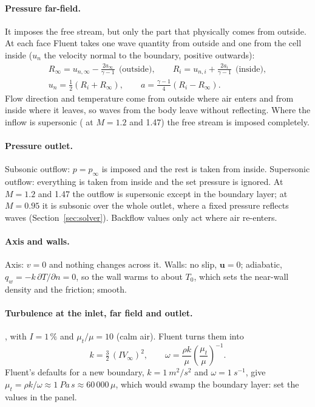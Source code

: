 \paragraph{Pressure far-field.} It imposes the free stream, but only the part that physically comes from
outside. At each face Fluent takes one wave quantity from outside and one from the cell inside ($u_n$ the
velocity normal to the boundary, positive outwards):
\begin{gather}
R_\infty = u_{n,\infty} - \frac{2a_\infty}{\gamma - 1} \ \ \text{(outside)}, \qquad
R_i = u_{n,i} + \frac{2a_i}{\gamma - 1} \ \ \text{(inside)}, \\
u_n = \tfrac12(R_i + R_\infty), \qquad a = \tfrac{\gamma - 1}{4}(R_i - R_\infty).
\end{gather}
Flow direction and temperature come from outside where air enters and from inside where it leaves, so
waves from the body leave without reflecting. Where the inflow is supersonic ( at $M = 1.2$ and
1.47) the free stream is imposed completely.

\paragraph{Pressure outlet.} Subsonic outflow: $p = p_\infty$ is imposed and the rest is taken from
inside. Supersonic outflow: everything is taken from inside and the set pressure is ignored. At $M = 1.2$
and 1.47 the outflow is supersonic except in the boundary layer; at $M = 0.95$ it is subsonic over the
whole outlet, where a fixed pressure reflects waves (Section~\ref{sec:solver}). Backflow values only act
where air re-enters.

\paragraph{Axis and walls.} Axis: $v = 0$ and nothing changes across it. Walls: no slip, $\mathbf u = 0$;
adiabatic, $q_w = -k\,\partial T/\partial n = 0$, so the wall warms to about $T_0$, which sets the
near-wall density and the friction; smooth.

\paragraph{Turbulence at the inlet, far field and outlet.} , with
$I = 1\,\%$ and $\mu_t/\mu = 10$ (calm air). Fluent turns them into
\begin{equation}
k = \tfrac32\,(I V_\infty)^2, \qquad \omega = \frac{\rho k}{\mu}\left(\frac{\mu_t}{\mu}\right)^{-1}.
\end{equation}
Fluent's defaults for a new boundary, $k = \SI{1}{m^2/s^2}$ and $\omega = \SI{1}{s^{-1}}$, give
$\mu_t = \rho k/\omega \approx \SI{1}{Pa\,s} \approx 60\,000\,\mu$, which would swamp the boundary layer:
set the values in the panel.

